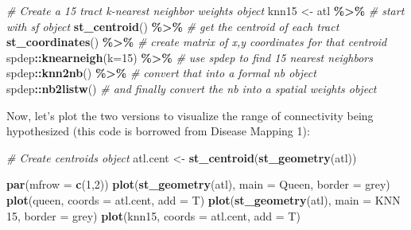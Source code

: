 \documentclass[
]{book}
\newenvironment{Shaded}{\begin{snugshade}}{\end{snugshade}}
\newcommand{\AttributeTok}[1]{\textcolor[rgb]{0.13,0.29,0.53}{#1}}
\newcommand{\CommentTok}[1]{\textcolor[rgb]{0.56,0.35,0.01}{\textit{#1}}}
\newcommand{\DecValTok}[1]{\textcolor[rgb]{0.00,0.00,0.81}{#1}}
\newcommand{\FunctionTok}[1]{\textcolor[rgb]{0.13,0.29,0.53}{\textbf{#1}}}
\newcommand{\NormalTok}[1]{#1}
\newcommand{\OtherTok}[1]{\textcolor[rgb]{0.56,0.35,0.01}{#1}}
\newcommand{\SpecialCharTok}[1]{\textcolor[rgb]{0.81,0.36,0.00}{\textbf{#1}}}
\newcommand{\StringTok}[1]{\textcolor[rgb]{0.31,0.60,0.02}{#1}}
\begin{document}
\begin{Shaded}
\begin{Highlighting}[]
\CommentTok{\# Create a 15 tract k{-}nearest neighbor weights object}
\NormalTok{knn15 }\OtherTok{\textless{}{-}}\NormalTok{ atl }\SpecialCharTok{\%\textgreater{}\%}               \CommentTok{\# start with sf object}
  \FunctionTok{st\_centroid}\NormalTok{() }\SpecialCharTok{\%\textgreater{}\%}            \CommentTok{\# get the centroid of each tract}
  \FunctionTok{st\_coordinates}\NormalTok{() }\SpecialCharTok{\%\textgreater{}\%}         \CommentTok{\# create matrix of x,y coordinates for that centroid}
\NormalTok{  spdep}\SpecialCharTok{::}\FunctionTok{knearneigh}\NormalTok{(}\AttributeTok{k=}\DecValTok{15}\NormalTok{) }\SpecialCharTok{\%\textgreater{}\%}  \CommentTok{\# use spdep to find 15 nearest neighbors}
\NormalTok{  spdep}\SpecialCharTok{::}\FunctionTok{knn2nb}\NormalTok{() }\SpecialCharTok{\%\textgreater{}\%}          \CommentTok{\# convert that into a formal nb object}
\NormalTok{  spdep}\SpecialCharTok{::}\FunctionTok{nb2listw}\NormalTok{()            }\CommentTok{\# and finally convert the nb into a spatial weights object}
\end{Highlighting}
\end{Shaded}

Now, let's plot the two versions to visualize the range of connectivity being hypothesized (this code is borrowed from Disease Mapping 1):

\begin{Shaded}
\begin{Highlighting}[]
\CommentTok{\# Create centroids object}
\NormalTok{atl.cent }\OtherTok{\textless{}{-}} \FunctionTok{st\_centroid}\NormalTok{(}\FunctionTok{st\_geometry}\NormalTok{(atl))}

\FunctionTok{par}\NormalTok{(}\AttributeTok{mfrow =} \FunctionTok{c}\NormalTok{(}\DecValTok{1}\NormalTok{,}\DecValTok{2}\NormalTok{))}
\FunctionTok{plot}\NormalTok{(}\FunctionTok{st\_geometry}\NormalTok{(atl), }\AttributeTok{main =} \StringTok{\textquotesingle{}Queen\textquotesingle{}}\NormalTok{, }\AttributeTok{border =} \StringTok{\textquotesingle{}grey\textquotesingle{}}\NormalTok{)}
\FunctionTok{plot}\NormalTok{(queen, }\AttributeTok{coords =}\NormalTok{ atl.cent, }\AttributeTok{add =}\NormalTok{ T)}
\FunctionTok{plot}\NormalTok{(}\FunctionTok{st\_geometry}\NormalTok{(atl), }\AttributeTok{main =} \StringTok{\textquotesingle{}KNN 15\textquotesingle{}}\NormalTok{, }\AttributeTok{border =} \StringTok{\textquotesingle{}grey\textquotesingle{}}\NormalTok{)}
\FunctionTok{plot}\NormalTok{(knn15, }\AttributeTok{coords =}\NormalTok{ atl.cent, }\AttributeTok{add =}\NormalTok{ T)}
\end{Highlighting}
\end{Shaded}
\end{document}
